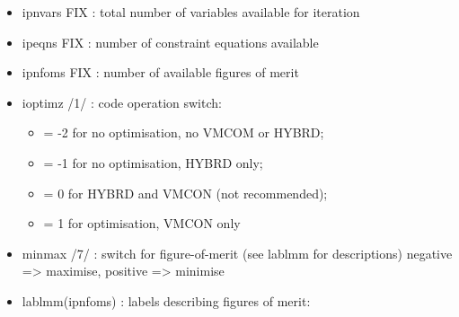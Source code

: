 \documentclass[]{article}
\providecommand{\tightlist}{%
  \setlength{\itemsep}{0pt}\setlength{\parskip}{0pt}}
\begin{document}
\begin{itemize}
\tightlist
\item
  ipnvars FIX : total number of variables available for iteration
\item
  ipeqns FIX : number of constraint equations available
\item
  ipnfoms FIX : number of available figures of merit
\item
  ioptimz /1/ : code operation switch:

  \begin{itemize}
  \tightlist
  \item
    = -2 for no optimisation, no VMCOM or HYBRD;
  \item
    = -1 for no optimisation, HYBRD only;
  \item
    = 0 for HYBRD and VMCON (not recommended);
  \item
    = 1 for optimisation, VMCON only
  \end{itemize}
\item
  minmax /7/ : switch for figure-of-merit (see lablmm for descriptions)
  negative =\textgreater{} maximise, positive =\textgreater{} minimise
\item
  lablmm(ipnfoms) : labels describing figures of merit:


\end{itemize}
\end{document}
